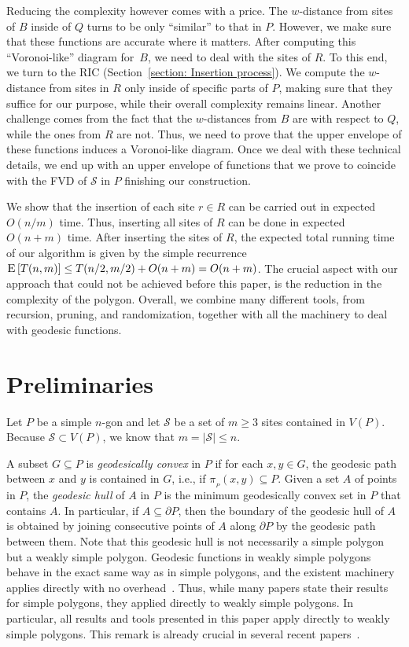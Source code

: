 \documentclass[a4paper, 11pt]{article}
\newcommand{\s}{\mathcal S}
\newcommand{\p}[3][P]{\ensuremath{\pi_{_{#1}}(#2, #3)}}
\newcommand{\ex}[1]{\textsc{E}\left[#1\right]}
\begin{document}
Reducing the complexity however comes with a price. The $w$-distance from sites  of $B$ inside of $Q$ turns to be only ``similar'' to that in $P$.
However, we make sure that these functions are accurate where it matters. 
After computing this ``Voronoi-like'' diagram for~$B$, we need to deal with the sites of $R$. 
To this end, we turn to the RIC (Section~\ref{section: Insertion process}).
We compute the $w$-distance from sites in $R$ only inside of specific parts of $P$, making sure that they suffice for our purpose, while their overall complexity remains linear.
Another challenge comes from the fact that the $w$-distances from $B$ are with respect to $Q$, while the ones from $R$ are not.
Thus, we need to prove that the upper envelope of these functions induces a Voronoi-like diagram.
Once we deal with these technical details, we end up with an upper envelope of functions that we prove to coincide with the FVD of $\s$ in $P$ finishing our construction. 

We show that the insertion of each site $r\in R$ can be carried out in expected $O(n/m)$ time.  
Thus, inserting all sites of $R$ can be done in expected $O(n+ m)$ time.
After inserting the sites of $R$, the expected total running time of our algorithm is given by the simple recurrence $\ex{T(n, m)} \leq T(n/2, m/2) + O(n+m) = O(n+ m)$.
The crucial aspect with our approach that could not be achieved before this paper, is the reduction in the complexity of the polygon. 
Overall, we combine many different tools, from recursion, pruning, and randomization, together with all the machinery to deal with geodesic functions. 

\section{Preliminaries}

Let $P$ be a simple $n$-gon and  let $\s$ be a set of $m\geq 3$ sites contained in $V(P)$. 
Because $\s\subset V(P)$, we know that $m = |\s|\leq  n$.

A subset $G\subseteq P$ is \emph{geodesically convex} in $P$ if for each $x,y\in G$, the geodesic path between $x$ and $y$ is contained in $G$, i.e., if $\p{x}{y}\subseteq P$.
Given a set $A$ of points in $P$, the \emph{geodesic hull} of $A$ in $P$ is the minimum geodesically convex set in $P$ that contains $A$. 
In particular, if $A\subseteq \partial P$, then the boundary of the geodesic hull of $A$ is obtained by joining consecutive points of $A$ along $\partial P$ by the geodesic path between them. Note that this geodesic hull is not necessarily a simple polygon but a weakly simple polygon. 
Geodesic functions in weakly simple polygons behave in the exact same way as in simple polygons, and the existent machinery applies directly with no overhead~\cite{chang2014detecting}. 
Thus, while many papers state their results for simple polygons, they applied directly to weakly simple polygons. 
In particular, all results and tools presented in this paper apply directly to weakly simple polygons.
This remark is already crucial in several recent papers~\cite{oh2016computing,oh2016farthest}.
\end{document}
